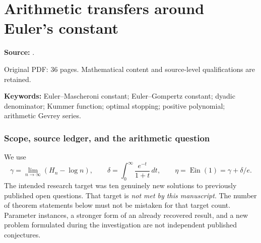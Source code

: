 \documentclass[11pt,a4paper]{article}
\theoremstyle{definition}
\theoremstyle{remark}
\DeclareMathOperator{\Ein}{Ein}
\numberwithin{equation}{section}
\begin{document}
\part{Arithmetic transfers around Euler's constant}
\label{part1:start}
\noindent\textbf{Source:} {\small{}}.

Original PDF: 36 pages. Mathematical content and source-level qualifications are retained.


\begin{abstract}
We investigate transfers from the Euler--Gompertz and $E$-function setting to
asymptotic arithmetic, orthogonal polynomials, special-function inequalities,
and optimal stopping. For the coefficients $d_k$ in the
Brent--Glasser--Guttmann expansion, we obtain the exact reduced denominator
$2^{6k-s_2(k)}$, where $s_2(k)$ is the binary digit sum, strengthening the
recovered integrality result. We prove both all-order coefficient sign
observations in that paper, using explicit analytic tail bounds and exact
finite certificates. A radial-oscillator transfer also gives exact
Gevrey order two and the Borel radius. We prove divergence of the factorially cleared
Euler--Gompertz approximants discussed by Murabayashi--Yoshida and a uniform
obstruction for all nonnegative integer-polynomial filters under that
normalization. A polynomial--Gamma monotonicity question receives sharp
answers with the coefficient assumptions made explicit. For rational dimension
and reward, Bessel-bridge stopping boundaries are algebraic exactly on the
lines $q-d\in2\mathbb Z_{\ge0}$; an exact parameter sensitivity recovers
$\Ein(1)=\gamma+\delta/e$. Every finite dimension jet of the quadratic
optimal value at dimension two is algebraically independent. Further results concern gamma-cancelling linear
forms and the limitations of moment positivity and Gevrey zero removal.
The manuscript distinguishes recovered results, extensions, and unproved
targets. It does not prove irrationality or transcendence of $\gamma$ and does
not establish ten new resolutions of published open problems.
\end{abstract}
\noindent\textbf{Keywords:} Euler--Mascheroni constant; Euler--Gompertz constant;
dyadic denominator; Kummer function; optimal stopping; positive polynomial;
arithmetic Gevrey series.


\section{Scope, source ledger, and the arithmetic question}
We use
\[
 \gamma=\lim_{n\to\infty}(H_n-\log n),\qquad
 \delta=\int_0^\infty\frac{e^{-t}}{1+t}\,dt,\qquad
 \eta=\Ein(1)=\gamma+\delta/e.
\]
The intended research target was ten genuinely new solutions to previously
published open questions. That target is \emph{not met by this manuscript}.
The number of theorem statements below must not be mistaken for that target
count. Parameter instances, a stronger form of an already recovered result,
and a new problem formulated during the investigation are not independent
published conjectures.
\end{document}
